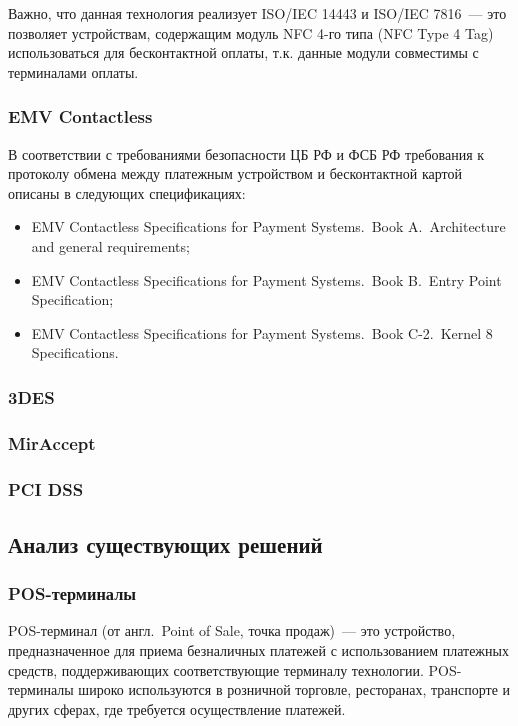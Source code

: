 Важно, что данная технология реализует ISO/IEC 14443 и ISO/IEC 7816~--- это позволяет устройствам, содержащим модуль NFC 4-го типа (NFC Type 4 Tag) использоваться для бесконтактной оплаты, т.к. данные модули совместимы с терминалами оплаты.


\subsubsection{EMV Contactless}

В соответствии с требованиями безопасности ЦБ РФ и ФСБ РФ требования к протоколу обмена между платежным устройством и бесконтактной картой описаны в следующих спецификациях:

\begin{itemize}
    \item EMV Contactless Specifications for Payment Systems.\ Book A.\ Architecture and general requirements;
    \item EMV Contactless Specifications for Payment Systems.\ Book B.\ Entry Point Specification;
    \item EMV Contactless Specifications for Payment Systems.\ Book C-2.\ Kernel 8 Specifications.
\end{itemize}

\subsubsection{3DES}
\subsubsection{MirAccept}


\subsubsection{PCI DSS}





\subsection{Анализ существующих решений}

\subsubsection{POS-терминалы}

POS-терминал (от англ.\ Point of Sale, точка продаж)~--- это устройство, предназначенное для приема безналичных платежей с использованием платежных средств, поддерживающих соответствующие терминалу технологии.
POS-терминалы широко используются в розничной торговле, ресторанах, транспорте и других сферах, где требуется осуществление платежей.

